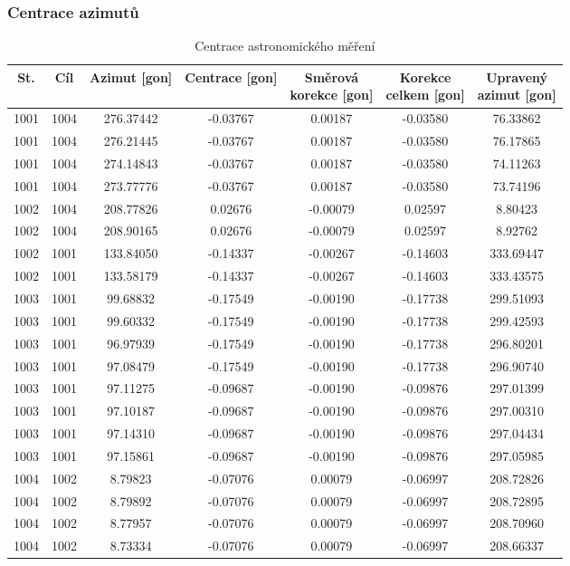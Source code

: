 \subsubsection{Centrace azimutů}
\begin{table}[H]
\centering
\begin{tabular}{|c|c|c||c|c|c||c|}
\hline
St. & Cíl & Azimut [gon] & Centrace [gon] & \makecell{Směrová\\korekce [gon]} & \makecell{Korekce\\ celkem  [gon]}& \makecell{Upravený\\ azimut [gon]}\\
\hline
1001 & 1004 & 276.37442 & -0.03767 & 0.00187 & -0.03580 & 76.33862 \\ \hline
1001 & 1004 & 276.21445 & -0.03767 & 0.00187 & -0.03580 & 76.17865 \\ \hline
1001 & 1004 & 274.14843 & -0.03767 & 0.00187 & -0.03580 & 74.11263 \\ \hline
1001 & 1004 & 273.77776 & -0.03767 & 0.00187 & -0.03580 & 73.74196 \\ \hline
1002 & 1004 & 208.77826 & 0.02676 & -0.00079 & 0.02597 & 8.80423 \\ \hline
1002 & 1004 & 208.90165 & 0.02676 & -0.00079 & 0.02597 & 8.92762 \\ \hline
1002 & 1001 & 133.84050 & -0.14337 & -0.00267 & -0.14603 & 333.69447 \\ \hline
1002 & 1001 & 133.58179 & -0.14337 & -0.00267 & -0.14603 & 333.43575 \\ \hline
1003 & 1001 & 99.68832 & -0.17549 & -0.00190 & -0.17738 & 299.51093 \\ \hline
1003 & 1001 & 99.60332 & -0.17549 & -0.00190 & -0.17738 & 299.42593 \\ \hline
1003 & 1001 & 96.97939 & -0.17549 & -0.00190 & -0.17738 & 296.80201 \\ \hline
1003 & 1001 & 97.08479 & -0.17549 & -0.00190 & -0.17738 & 296.90740 \\ \hline
1003 & 1001 & 97.11275 & -0.09687 & -0.00190 & -0.09876 & 297.01399 \\ \hline
1003 & 1001 & 97.10187 & -0.09687 & -0.00190 & -0.09876 & 297.00310 \\ \hline
1003 & 1001 & 97.14310 & -0.09687 & -0.00190 & -0.09876 & 297.04434 \\ \hline
1003 & 1001 & 97.15861 & -0.09687 & -0.00190 & -0.09876 & 297.05985 \\ \hline
1004 & 1002 & 8.79823 & -0.07076 & 0.00079 & -0.06997 & 208.72826 \\ \hline
1004 & 1002 & 8.79892 & -0.07076 & 0.00079 & -0.06997 & 208.72895 \\ \hline
1004 & 1002 & 8.77957 & -0.07076 & 0.00079 & -0.06997 & 208.70960 \\ \hline
1004 & 1002 & 8.73334 & -0.07076 & 0.00079 & -0.06997 & 208.66337 \\
\hline
\end{tabular}
\caption{Centrace astronomického měření}
\end{table}


